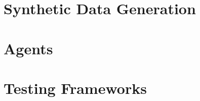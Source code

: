 \documentclass[9pt]{article}
\begin{document}
\section{Synthetic Data Generation}


\section{Agents}


\section{Testing Frameworks}
\end{document}
